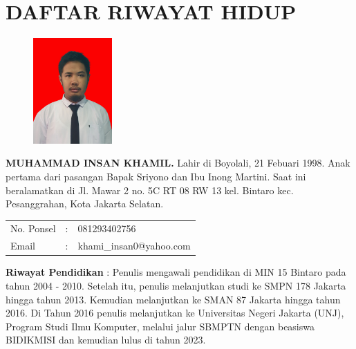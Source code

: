 \pagestyle{empty}
\chapter*{\centering \large DAFTAR RIWAYAT HIDUP}
\thispagestyle{empty}

\begin{figure}
	\vspace{-25pt}
	\begin{center}
		\includegraphics[width=0.27\textwidth]{gambar/pas-foto}
	\end{center}
	\vspace{-80pt}
\end{figure}

\noindent \textbf{MUHAMMAD INSAN KHAMIL.}  Lahir di Boyolali, 21 Febuari 1998.  Anak pertama dari pasangan Bapak Sriyono dan Ibu Inong Martini. Saat ini beralamatkan di Jl. Mawar 2 no. 5C RT 08 RW 13 kel. Bintaro kec. Pesanggrahan, Kota Jakarta Selatan.

\vspace{0.5cm}
\noindent
\begin{center}
	\begin{flushright}
		\begin{tabular}{lcl}
			No. Ponsel	& :&  081293402756 \\
			Email	& :& khami\_insan0@yahoo.com
		\end{tabular}
	\end{flushright}
\end{center}
\vspace{0.5cm}

\noindent \textbf{Riwayat Pendidikan} : Penulis mengawali pendidikan di MIN 15 Bintaro pada tahun 2004 - 2010. Setelah itu, penulis melanjutkan studi ke SMPN 178 Jakarta hingga tahun 2013. Kemudian melanjutkan ke SMAN 87 Jakarta hingga tahun 2016. Di Tahun 2016 penulis melanjutkan ke Universitas Negeri Jakarta (UNJ), Program Studi Ilmu Komputer, melalui jalur SBMPTN dengan beasiswa BIDIKMISI dan kemudian lulus di tahun 2023.

